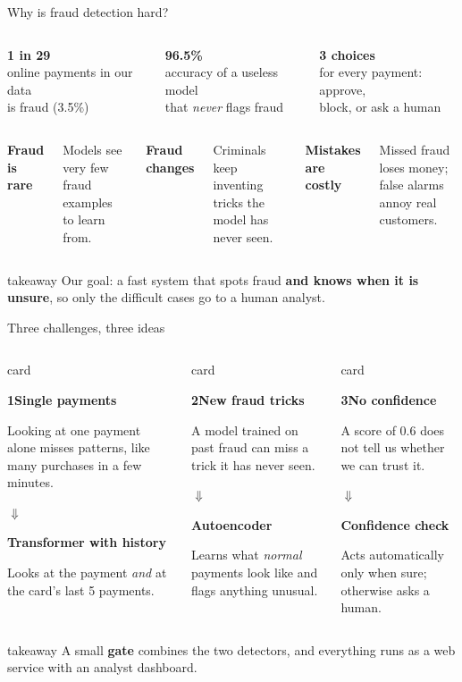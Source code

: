 \documentclass[aspectratio=169,11pt]{beamer}
\newcommand{\bignum}[3][brand]{%
  \begin{minipage}[t]{\linewidth}\centering
    {\fontsize{24}{26}\selectfont\bfseries\color{#1}#2}\\[0.35em]
    {\footnotesize\color{muted}#3}
  \end{minipage}}
\newcommand{\point}[2]{%
  {\small\bfseries\color{brand}#1\par}\vspace{0.1em}
  {\footnotesize #2\par}}
\newcommand{\takeaway}[1]{%
  \par\vspace{0.35em}
  \begin{beamercolorbox}[wd=\linewidth,sep=0.45em,rounded=true]{takeaway}%
    \small #1
  \end{beamercolorbox}}
\newcommand{\keyline}[1]{%
  \par\vspace{0.25em}
  \begin{beamercolorbox}[wd=\linewidth,sep=0.35em,rounded=true]{takeaway}%
    \footnotesize #1
  \end{beamercolorbox}}
\newcommand{\gapcard}[4]{%
  \begin{beamercolorbox}[wd=\linewidth,sep=0.5em,rounded=true]{card}
    {\small\bfseries\color{block}#1\par}\vspace{0.2em}
    {\footnotesize #2\par}\vspace{0.2em}
    {\centering\color{brandmid}$\Downarrow$\par}\vspace{0.1em}
    {\small\bfseries\color{brand}#3\par}\vspace{0.1em}
    {\footnotesize #4\par}
  \end{beamercolorbox}}
\begin{document}
\begin{frame}{Why is fraud detection hard?}
  \vspace{0.2em}
  \begin{columns}[T]
      \bignum[block]{1 in 29}{online payments in our data\\is fraud (3.5\%)}
      \bignum[review]{96.5\%}{accuracy of a useless model\\that \emph{never} flags fraud}
      \bignum{3 choices}{for every payment: approve,\\block, or ask a human}
  \end{columns}
  \vspace{1.1em}
  \begin{columns}[T]
      \point{Fraud is rare}{Models see very few fraud examples to learn from.}
      \point{Fraud changes}{Criminals keep inventing tricks the model has never seen.}
      \point{Mistakes are costly}{Missed fraud loses money; false alarms annoy real customers.}
  \end{columns}
  \vfill
  \takeaway{Our goal: a fast system that spots fraud \textbf{and knows when it is unsure},
    so only the difficult cases go to a human analyst.}
\end{frame}

\begin{frame}{Three challenges, three ideas}
  \begin{columns}[T]
      \gapcard{1\enspace Single payments}
        {Looking at one payment alone misses patterns, like many purchases in a few minutes.}
        {Transformer with history}
        {Looks at the payment \emph{and} at the card's last 5 payments.}
      \gapcard{2\enspace New fraud tricks}
        {A model trained on past fraud can miss a trick it has never seen.}
        {Autoencoder}
        {Learns what \emph{normal} payments look like and flags anything unusual.}
      \gapcard{3\enspace No confidence}
        {A score of 0.6 does not tell us whether we can trust it.}
        {Confidence check}
        {Acts automatically only when sure; otherwise asks a human.}
  \end{columns}
  \vfill
  \keyline{A small \textbf{gate} combines the two detectors, and everything runs as a web
    service with an analyst dashboard.}
\end{frame}
\end{document}
